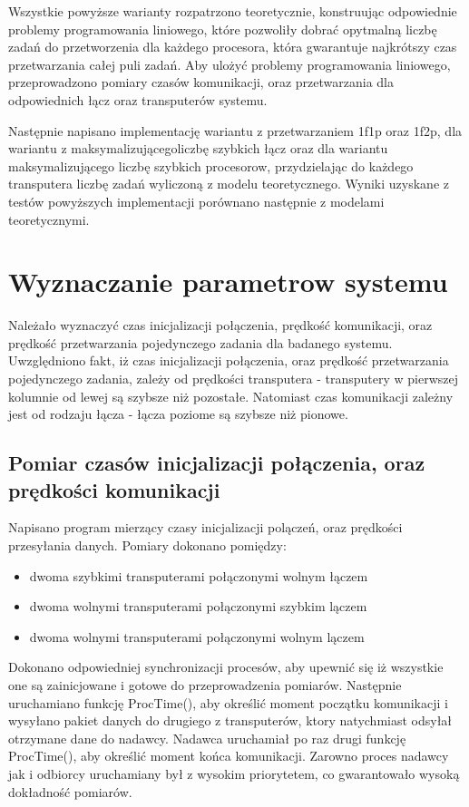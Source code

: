 \documentclass[a4paper,11pt, titlepage]{article}
\begin{document}
Wszystkie powyższe warianty rozpatrzono teoretycznie, konstruując odpowiednie problemy programowania liniowego, które pozwoliły dobrać opytmalną liczbę zadań do przetworzenia dla każdego procesora, która gwarantuje najkrótszy czas przetwarzania całej puli zadań. Aby ulożyć problemy programowania liniowego, przeprowadzono pomiary czasów komunikacji, oraz przetwarzania dla odpowiednich łącz oraz transputerów systemu.

Następnie napisano implementację wariantu z przetwarzaniem 1f1p oraz 1f2p, dla wariantu z maksymalizującegoliczbę szybkich łącz oraz dla wariantu maksymalizującego liczbę szybkich procesorow, przydzielając do każdego transputera liczbę zadań wyliczoną z modelu teoretycznego. Wyniki uzyskane z testów powyższych implementacji porównano następnie z modelami teoretycznymi.

\section{Wyznaczanie parametrow systemu}
Należało wyznaczyć czas inicjalizacji połączenia, prędkość komunikacji, oraz prędkość przetwarzania pojedynczego zadania dla badanego systemu. Uwzględniono fakt, iż czas inicjalizacji połączenia, oraz prędkość przetwarzania pojedynczego zadania, zależy od prędkości transputera - transputery w pierwszej kolumnie od lewej są szybsze niż pozostałe. Natomiast czas komunikacji zależny jest od rodzaju łącza - łącza poziome są szybsze niż pionowe.

\subsection{Pomiar czasów inicjalizacji połączenia, oraz prędkości komunikacji}
Napisano program mierzący czasy inicjalizacji polączeń, oraz prędkości przesyłania danych. Pomiary dokonano pomiędzy:
\begin{itemize}
\item dwoma szybkimi transputerami połączonymi wolnym łączem
\item dwoma wolnymi transputerami połączonymi szybkim lączem
\item dwoma wolnymi transputerami połączonymi wolnym lączem
\end{itemize}
Dokonano odpowiedniej synchronizacji procesów, aby upewnić się iż wszystkie one są zainicjowane i gotowe do przeprowadzenia pomiarów. Następnie uruchamiano funkcję ProcTime(), aby określić moment początku komunikacji i wysyłano pakiet danych do drugiego z transputerów, ktory natychmiast odsyłał otrzymane dane do nadawcy. Nadawca uruchamiał po raz drugi funkcję ProcTime(), aby określić moment końca komunikacji. Zarowno proces nadawcy jak i odbiorcy uruchamiany był z wysokim priorytetem, co gwarantowało wysoką dokładność pomiarów.
\end{document}
